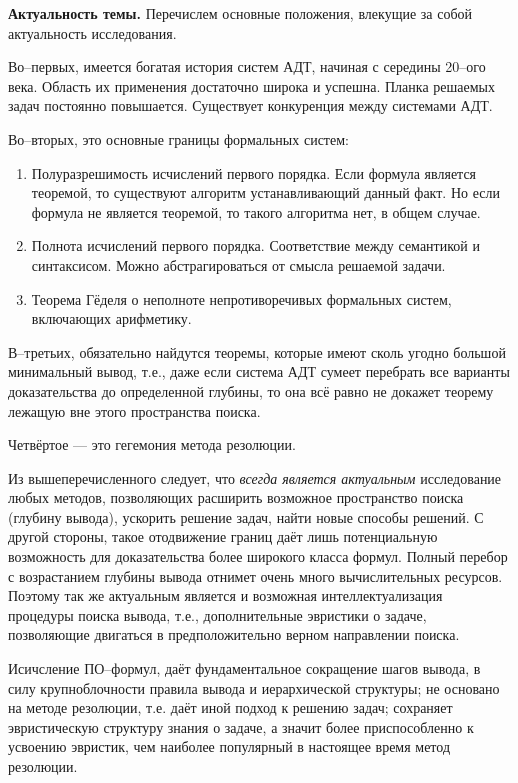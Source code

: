 \documentclass[a4paper]{report}
\begin{document}
\textbf{Актуальность темы.}
Перечислем основные положения, влекущие за собой актуальность исследования.

Во--первых, имеется богатая история систем АДТ, начиная с середины 20--ого века. Область их применения достаточно широка и успешна. Планка решаемых задач постоянно повышается. Существует конкуренция между системами АДТ.

Во--вторых, это основные границы формальных систем:
\begin{enumerate}
\item Полуразрешимость исчислений первого порядка. Если формула является теоремой, то существуют алгоритм устанавливающий данный факт. Но если формула не является теоремой, то такого алгоритма нет, в общем случае.
\item Полнота исчислений первого порядка. Соответствие между семантикой и синтаксисом. Можно абстрагироваться от смысла решаемой задачи.
\item Теорема Гёделя о неполноте непротиворечивых формальных систем, включающих арифметику.
\end{enumerate}

В--третьих, обязательно найдутся теоремы, которые имеют сколь угодно большой минимальный вывод, т.е., даже если система АДТ сумеет перебрать все варианты доказательства до определенной глубины, то она всё равно не докажет теорему лежащую вне этого пространства поиска.

Четвёртое --- это гегемония метода резолюции.

Из вышеперечисленного следует, что \emph{всегда является актуальным} исследование любых методов, позволяющих расширить возможное пространство поиска (глубину вывода), ускорить решение задач, найти новые способы решений. С другой стороны, такое отодвижение границ даёт лишь потенциальную возможность для доказательства более широкого класса формул. Полный перебор с возрастанием глубины вывода отнимет очень много вычислительных ресурсов. Поэтому так же актуальным является и возможная интеллектуализация процедуры поиска вывода, т.е., дополнительные эвристики о задаче, позволяющие двигаться в предположительно верном направлении поиска.

Исичсление ПО--формул, даёт фундаментальное сокращение шагов вывода, в силу крупноблочности правила вывода и иерархической структуры; не основано на методе резолюции, т.е. даёт иной подход к решению задач; сохраняет эвристическую структуру знания о задаче, а значит более приспособленно к усвоению эвристик, чем наиболее популярный в настоящее время метод резолюции.
\end{document}
